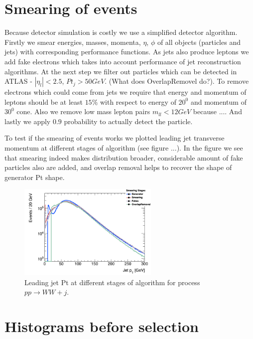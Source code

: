 \documentclass[tightenline,notitlepage,nofootinbib]{revtex4-1}
\begin{document}
\section{Smearing of events}

Because detector simulation is costly we use a simplified detector algorithm. Firstly we smear energies, masses, momenta, $\eta$, $\phi$ of all objects (particles and jets) with corresponding performance functions. As jets also produce leptons we add fake electrons which takes into account performance of jet reconstruction algorithms. At the next step we filter out particles which can be detected in ATLAS - $|\eta_l|<2.5$, $Pt_j>50 GeV$. (What does OverlapRemovel do?). To remove electrons which could come from jets we require that energy and momentum of leptons should be at least $15\%$ with respect to energy of $20^0$ and momentum of $30^0$ cone. Also we remove low mass lepton pairs $m_{ll}<12 GeV$ because .... And lastly we apply $0.9$ probability to actually detect the particle.

To test if the smearing of events works we plotted leading jet transverse momentum at different stages of algorithm (see figure ...). In the figure we see that smearing indeed makes distribution broader, considerable amount of fake particles also are added, and overlap removal helps to recover the shape of generator Pt shape. 
\begin{figure}
  \includegraphics[width=0.6\textwidth]{h_PtJets1stStages.png}
  \caption{Leading jet Pt at different stages of algorithm for process $pp \rightarrow WW +j$.}
\end{figure}

\section{Histograms before selection}
\end{document}
